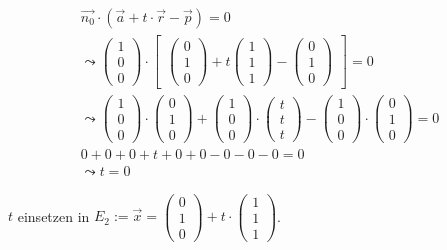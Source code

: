 \begin{gather}
\vec{n_0} \cdot (\vec{a}+t\cdot \vec{r}-\vec{p})=0\\
\leadsto 
\begin{pmatrix}
1\\0\\0
\end{pmatrix} \cdot 
\begin{bmatrix}
\begin{pmatrix}
0\\1\\0
\end{pmatrix}
+ t
\begin{pmatrix}
1\\1\\1
\end{pmatrix}
-
\begin{pmatrix}
0\\1\\0
\end{pmatrix}
\end{bmatrix} = 0\\
\leadsto
\begin{pmatrix}
1\\0\\0
\end{pmatrix}\cdot
\begin{pmatrix}
0\\1\\0
\end{pmatrix}
+
\begin{pmatrix}
1\\0\\0
\end{pmatrix}
\cdot
\begin{pmatrix}
t\\t\\t
\end{pmatrix}
-
\begin{pmatrix}
1\\0\\0
\end{pmatrix}
\cdot
\begin{pmatrix}
0\\1\\0
\end{pmatrix} =0\\
0+0+0+t+0+0-0-0-0=0\\
\leadsto t=0
\end{gather}

\ensuremath{t} einsetzen in \ensuremath{E_2:= \vec{x}=\begin{pmatrix}
		0\\1\\0
	\end{pmatrix} +t\cdot\begin{pmatrix}
		1\\1\\1
\end{pmatrix}}.\\

